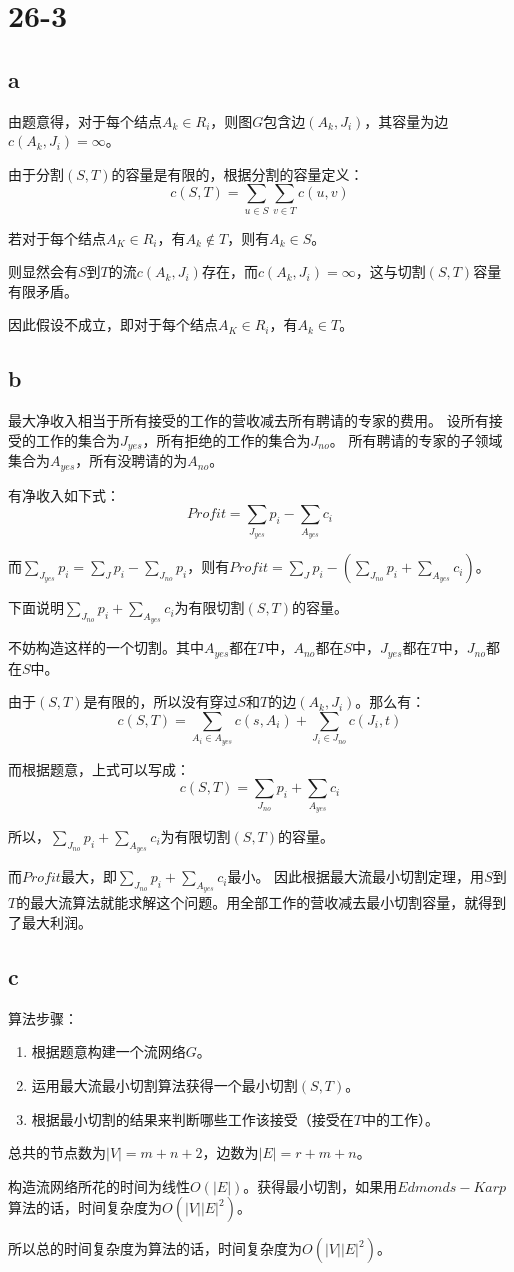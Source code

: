 \documentclass[UTF8]{ctexart}
\begin{document}
    \section{26-3}
    \subsection{a}
    由题意得，对于每个结点$A_k\in R_i$，则图$G$包含边$(A_k,J_i)$，其容量为边$c(A_k,J_i)=\infty$。

    由于分割$(S,T)$的容量是有限的，根据分割的容量定义：
    $$c(S,T)=\sum_{u\in S}\sum_{v\in T}c(u,v)$$

    若对于每个结点$A_K\in R_i$，有$A_k\notin T$，则有$A_k\in S$。

    则显然会有$S$到$T$的流$c(A_k,J_i)$存在，而$c(A_k,J_i)=\infty$，这与切割$(S,T)$容量有限矛盾。

    因此假设不成立，即对于每个结点$A_K\in R_i$，有$A_k\in T$。
    \subsection{b}
    最大净收入相当于所有接受的工作的营收减去所有聘请的专家的费用。
    设所有接受的工作的集合为$J_{yes}$，所有拒绝的工作的集合为$J_{no}$。
    所有聘请的专家的子领域集合为$A_{yes}$，所有没聘请的为$A_{no}$。

    有净收入如下式：
    $$Profit=\sum_{J_{yes}} p_i-\sum_{A_{yes}} c_i$$

    而$\sum_{J_{yes}} p_i=\sum_{J}p_i-\sum_{J_{no}}p_i$，则有$Profit=\sum_{J}p_i-(\sum_{J_{no}}p_i+\sum_{A_{yes}} c_i)$。
    
    下面说明$\sum_{J_{no}}p_i+\sum_{A_{yes}} c_i$为有限切割$(S,T)$的容量。

    不妨构造这样的一个切割。其中$A_{yes}$都在$T$中，$A_{no}$都在$S$中，$J_{yes}$都在$T$中，$J_{no}$都在$S$中。

    由于$(S,T)$是有限的，所以没有穿过$S$和$T$的边$(A_k,J_i)$。那么有：
    $$c(S,T)=\sum_{A_i\in A_{yes}}c(s,A_i)+\sum_{J_i\in J_{no}}c(J_i,t)$$

    而根据题意，上式可以写成：
    $$c(S,T)=\sum_{J_{no}}p_i+\sum_{A_{yes}} c_i$$

    所以，$\sum_{J_{no}}p_i+\sum_{A_{yes}} c_i$为有限切割$(S,T)$的容量。

    而$Profit$最大，即$\sum_{J_{no}}p_i+\sum_{A_{yes}} c_i$最小。
    因此根据最大流最小切割定理，用$S$到$T$的最大流算法就能求解这个问题。用全部工作的营收减去最小切割容量，就得到了最大利润。
    \subsection{c}
    算法步骤：
    \begin{enumerate}
      \item 根据题意构建一个流网络$G$。
      \item 运用最大流最小切割算法获得一个最小切割$(S,T)$。
      \item 根据最小切割的结果来判断哪些工作该接受（接受在$T$中的工作）。
    \end{enumerate}

    总共的节点数为$|V|=m+n+2$，边数为$|E|=r+m+n$。
    
    构造流网络所花的时间为线性$O(|E|)$。获得最小切割，如果用$Edmonds-Karp$算法的话，时间复杂度为$O(|V||E|^2)$。

    所以总的时间复杂度为算法的话，时间复杂度为$O(|V||E|^2)$。
\end{document}
